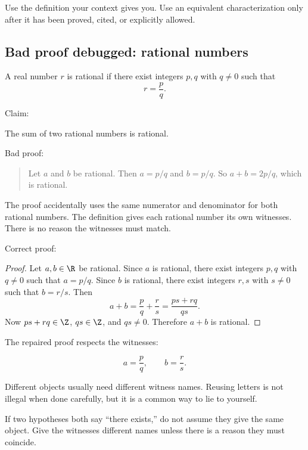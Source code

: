 \begin{formalbox}
Use the definition your context gives you. Use an equivalent characterization only after it has been proved, cited, or explicitly allowed.
\end{formalbox}

\subsection{Bad proof debugged: rational numbers}

\begin{definition}
A real number $r$ is rational if there exist integers $p,q$ with $q\neq0$ such that
\[
r=\frac pq.
\]
\end{definition}

Claim:

\begin{theorem}
The sum of two rational numbers is rational.
\end{theorem}

Bad proof:

\begin{quote}
Let $a$ and $b$ be rational. Then $a=p/q$ and $b=p/q$. So $a+b=2p/q$, which is rational.
\end{quote}

The proof accidentally uses the same numerator and denominator for both rational numbers. The definition gives each rational number its own witnesses. There is no reason the witnesses must match.

Correct proof:

\begin{proof}
Let $a,b\in\R$ be rational. Since $a$ is rational, there exist integers $p,q$ with $q\neq0$ such that $a=p/q$. Since $b$ is rational, there exist integers $r,s$ with $s\neq0$ such that $b=r/s$. Then
\[
a+b=\frac pq+\frac rs=\frac{ps+rq}{qs}.
\]
Now $ps+rq\in\Z$, $qs\in\Z$, and $qs\neq0$. Therefore $a+b$ is rational.
\end{proof}

The repaired proof respects the witnesses:

\[
a=\frac pq,\qquad b=\frac rs.
\]

Different objects usually need different witness names. Reusing letters is not illegal when done carefully, but it is a common way to lie to yourself.

\begin{trapbox}
If two hypotheses both say ``there exists,'' do not assume they give the same object. Give the witnesses different names unless there is a reason they must coincide.
\end{trapbox}

